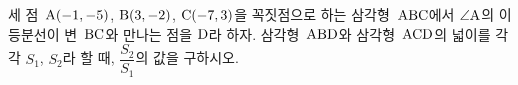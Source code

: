 세 점~$\mathrm{A}(-1{,}\mkern3mu\mathopen{}-5)$, $\mathrm{B}(3{,}\mkern3mu\mathopen{}-2)$, $\mathrm{C}(-7{,}\mkern3mu\mathopen{}3)$을 꼭짓점으로 하는 삼각형~$\mathrm{ABC}$에서 $\angle\mathrm{A}$의 이등분선이 변~$\mathrm{BC}$와 만나는 점을 $\mathrm{D}$라 하자. 삼각형~$\mathrm{ABD}$와 삼각형~$\mathrm{ACD}$의 넓이를 각각 $S_1$, $S_2$라 할 때, $\dfrac{S_2}{S_1}$의 값을 구하시오.
